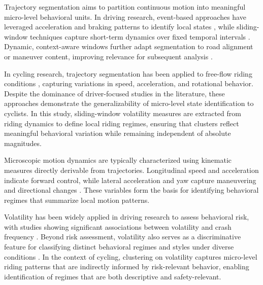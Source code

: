 Trajectory segmentation aims to partition continuous motion into meaningful micro-level behavioral units. In driving research, event-based approaches have leveraged acceleration and braking patterns to identify local states \cite{yarlagadda_exploring_2022}, while sliding-window techniques capture short-term dynamics over fixed temporal intervals \cite{bachir_identifying_2025, li_volatility-based_2025, zhang_proactive_2023}. Dynamic, context-aware windows further adapt segmentation to road alignment or maneuver content, improving relevance for subsequent analysis \cite{li_unsupervised_2022}.

In cycling research, trajectory segmentation has been applied to free-flow riding conditions \cite{bachir_identifying_2025}, capturing variations in speed, acceleration, and rotational behavior. Despite the dominance of driver-focused studies in the literature, these approaches demonstrate the generalizability of micro-level state identification to cyclists. In this study, sliding-window volatility measures are extracted from riding dynamics to define local riding regimes, ensuring that clusters reflect meaningful behavioral variation while remaining independent of absolute magnitudes.


Microscopic motion dynamics are typically characterized using kinematic measures directly derivable from trajectories. Longitudinal speed and acceleration indicate forward control, while lateral acceleration and yaw capture maneuvering and directional changes \cite{arvin_how_2019, arvin_safety_2021, bachir_identifying_2025, li_volatility-based_2025, wang_what_2015, yarlagadda_exploring_2022}. These variables form the basis for identifying behavioral regimes that summarize local motion patterns.

Volatility has been widely applied in driving research to assess behavioral risk, with studies showing significant associations between volatility and crash frequency \cite{kamrani_extracting_2018, arvin_how_2019, zhang_proactive_2023}. Beyond risk assessment, volatility also serves as a discriminative feature for classifying distinct behavioral regimes and styles under diverse conditions \cite{mohammadnazar_classifying_2021, li_volatility-based_2025, yarlagadda_exploring_2022, wang_what_2015}. In the context of cycling, clustering on volatility captures micro-level riding patterns that are indirectly informed by risk-relevant behavior, enabling identification of regimes that are both descriptive and safety-relevant.

